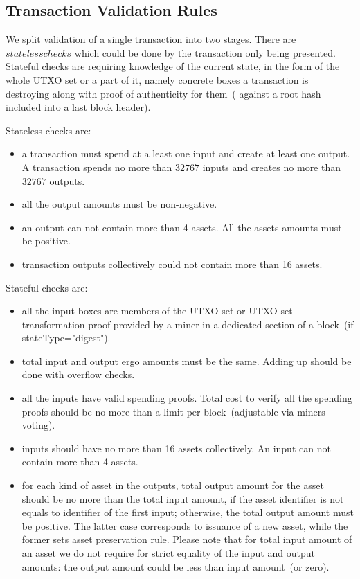 \documentclass[]{article}   %
\newcommand{\authnote}[2]{\marginpar{\parbox{\marginparwidth}{\tiny %
  \textsf{#1 {\textcolor{blue}{notes: #2}}}}}%
  \textcolor{blue}{\textbf{\dag}}}
\newcommand{\authnote}[2]{
  \textsf{#1 \textcolor{blue}{: #2}}}
\newcommand{\authnote}[2]{}
\newcommand{\knote}[1]{{\authnote{\textcolor{green}{Alex notes}}{#1}}}
\begin{document}
\subsection{Transaction Validation Rules}
\label{tx-validation}

We split validation of a single transaction into two stages. There are $stateless checks$ which could be done by the
transaction only being presented. Stateful checks are requiring knowledge of the current state, in the form of the whole
UTXO set or a part of it, namely concrete boxes a transaction is destroying along with proof of authenticity for them~(
against a root hash included into a last block header).

Stateless checks are:

\begin{itemize}
    \item{} a transaction must spend at a least one input and create at least one output. A transaction spends no more
    than $32767$ inputs and creates no more than $32767$ outputs.
    \item{} all the output amounts must be non-negative.
    \item{} an output can not contain more than 4 assets. All the assets amounts must be positive.
    \item{} transaction outputs collectively could not contain more than 16 assets.
\end{itemize}

\knote{Should we allow 0-value iutputs?}

\knote{Check box and transaction sizes.}

Stateful checks are:

\begin{itemize}
    \item{} all the input boxes are members of the UTXO set or UTXO set transformation proof
     provided by a miner in a dedicated section of a block~(if stateType="digest").
    \item{} total input and output ergo amounts must be the same. Adding up should be done with overflow checks.
    \item{} all the inputs have valid spending proofs. Total cost to verify all the spending proofs should be no more
            than a limit per block~(adjustable via miners voting).
    \item{} inputs should have no more than 16 assets collectively. An input can not contain more than 4 assets.
    \item{} for each kind of asset in the outputs, total output amount for the asset should be no more than the total
            input amount, if the asset identifier is not equals to identifier of the first input; otherwise, the total
            output amount must be positive. The latter case corresponds to issuance of a new asset, while the former
            sets asset preservation rule. Please note that for total input amount of an asset we do not require for
            strict equality of the input and output amounts: the output amount could be less than input amount~(or zero).
\end{itemize}
\end{document}

